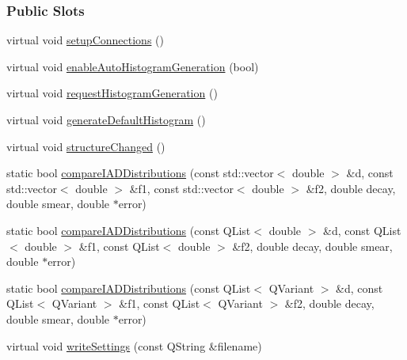 \subsubsection*{Public Slots}
\begin{DoxyCompactItemize}
\item 
virtual void \hyperlink{classGlobalSearch_1_1Structure_aff5394b9be0fa599c58f906d9a03f9d5}{setup\+Connections} ()
\item 
virtual void \hyperlink{classGlobalSearch_1_1Structure_a36f95cfbd571cce162a4bc59bb468f61}{enable\+Auto\+Histogram\+Generation} (bool)
\item 
virtual void \hyperlink{classGlobalSearch_1_1Structure_aaed562bf0ad4fe7bec1567eb84dbeee2}{request\+Histogram\+Generation} ()
\item 
virtual void \hyperlink{classGlobalSearch_1_1Structure_a57ae57cebf3df177a1363b91383a1c69}{generate\+Default\+Histogram} ()
\item 
virtual void \hyperlink{classGlobalSearch_1_1Structure_a1e30a18add5bd7e217546333262010ad}{structure\+Changed} ()
\item 
static bool \hyperlink{classGlobalSearch_1_1Structure_a92cca2b7d5a566d69dd228d267758c73}{compare\+I\+A\+D\+Distributions} (const std\+::vector$<$ double $>$ \&d, const std\+::vector$<$ double $>$ \&f1, const std\+::vector$<$ double $>$ \&f2, double decay, double smear, double $\ast$error)
\item 
static bool \hyperlink{classGlobalSearch_1_1Structure_a70f9ced5a098560bad9fe97d1bb6361a}{compare\+I\+A\+D\+Distributions} (const Q\+List$<$ double $>$ \&d, const Q\+List$<$ double $>$ \&f1, const Q\+List$<$ double $>$ \&f2, double decay, double smear, double $\ast$error)
\item 
static bool \hyperlink{classGlobalSearch_1_1Structure_aaed919f70884814f824aac01d619f004}{compare\+I\+A\+D\+Distributions} (const Q\+List$<$ Q\+Variant $>$ \&d, const Q\+List$<$ Q\+Variant $>$ \&f1, const Q\+List$<$ Q\+Variant $>$ \&f2, double decay, double smear, double $\ast$error)
\item 
virtual void \hyperlink{classGlobalSearch_1_1Structure_af6da83169c21363c545ef3ee01d891d3}{write\+Settings} (const Q\+String \&filename)
\end{DoxyCompactItemize}
